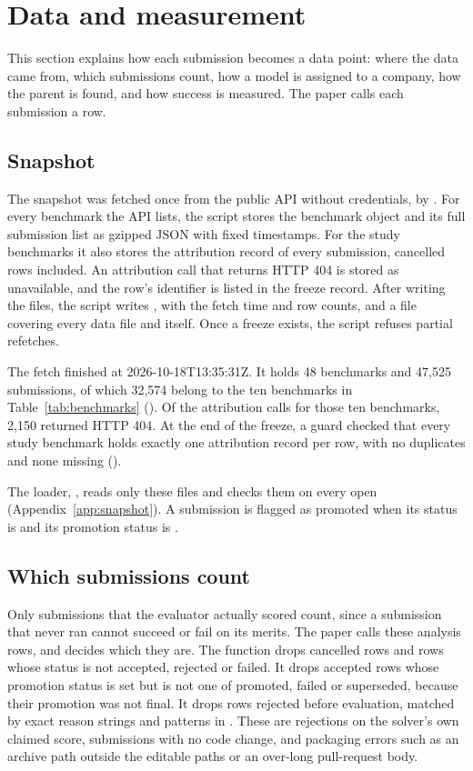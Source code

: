 \section{Data and measurement}
\label{sec:data}

This section explains how each submission becomes a data point: where the data came from, which submissions count, how a model is assigned to a company, how the parent is found, and how success is measured.
The paper calls each submission a row.

\subsection{Snapshot}
\label{sec:snapshot}

The snapshot was fetched once from the public API without credentials, by .
For every benchmark the API lists, the script stores the benchmark object and its full submission list as gzipped JSON with fixed timestamps.
For the study benchmarks it also stores the attribution record of every submission, cancelled rows included.
An attribution call that returns HTTP 404 is stored as unavailable, and the row's identifier is listed in the freeze record.
After writing the files, the script writes , with the fetch time and row counts, and a  file covering every data file and  itself.
Once a freeze exists, the script refuses partial refetches.

The fetch finished at 2026-10-18T13:35:31Z.
It holds 48 benchmarks and 47,525 submissions, of which 32,574 belong to the ten benchmarks in Table~\ref{tab:benchmarks} ().
Of the attribution calls for those ten benchmarks, 2,150 returned HTTP 404.
At the end of the freeze, a guard checked that every study benchmark holds exactly one attribution record per row, with no duplicates and none missing ().

The loader, , reads only these files and checks them on every open (Appendix~\ref{app:snapshot}).
A submission is flagged as promoted when its status is  and its promotion status is .

\subsection{Which submissions count}
\label{sec:denominator}

Only submissions that the evaluator actually scored count, since a submission that never ran cannot succeed or fail on its merits.
The paper calls these analysis rows, and  decides which they are.
The function drops cancelled rows and rows whose status is not accepted, rejected or failed.
It drops accepted rows whose promotion status is set but is not one of promoted, failed or superseded, because their promotion was not final.
It drops rows rejected before evaluation, matched by exact reason strings and patterns in .
These are rejections on the solver's own claimed score, submissions with no code change, and packaging errors such as an archive path outside the editable paths or an over-long pull-request body.

